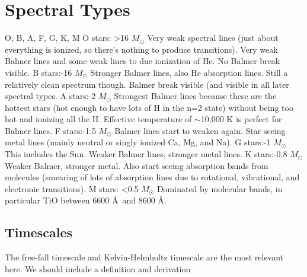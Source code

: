 \section{Spectral Types}
O, B, A, F, G, K, M\newline
O stars:\newline
>16 $M_{\odot}$\newline
Very weak spectral lines (just about everything is ionized, so there's nothing 
to produce transitions).  Very weak Balmer lines and some weak lines to due 
ionization of He.  No Balmer break visible.\newline
B stars:-16 $M_{\odot}$\newline
Stronger Balmer lines, also He absorption lines.  Still a relatively clean 
spectrum though.  Balmer break visible (and visible in all later spectral 
types.\newline
A stars:-2 $M_{\odot}$\newline
Strongest Balmer lines because these are the hottest stars (hot enough to have 
lots of H in the n=2 state) without being too hot and ionizing all the H.  
Effective temperature of $\sim$10,000 K is perfect for Balmer lines.\newline
F stars:-1.5 $M_{\odot}$\newline
Balmer lines start to weaken again.  Star seeing metal lines (mainly neutral 
or singly ionized Ca, Mg, and Na).\newline
G stars:-1 $M_{\odot}$\newline
This includes the Sun.  Weaker Balmer lines, stronger metal lines.\newline
K stars:-0.8 $M_{\odot}$\newline
Weaker Balmer, stronger metal.  Also start seeing absorption bands from 
molecules (smearing of lots of absorption lines due to rotational, vibrational, 
and electronic transitions).
M stars:\newline
<0.5 $M_{\odot}$\newline
Dominated by molecular bands, in particular TiO between 6600 \AA\ and 8600 \AA.

\subsection{Timescales}
The free-fall timescale and Kelvin-Helmholtz timescale are the most relevant here.  We should
include a definition and derivation

